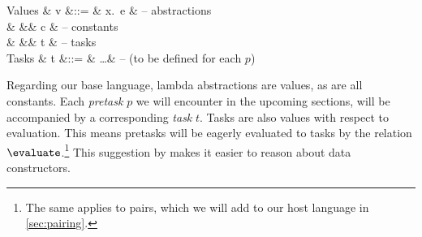 \begin{grammar}
  Values
    & v &::= & \lambda x.\ e  & – abstractions \\
    &   &\mid& c              & – constants \\
    &   &\mid& t              & – tasks \\
  Tasks
    & t &::= & \ldots         & – (to be defined for each $p$) \\
\end{grammar}
Regarding our base language, lambda abstractions are values, as are all constants.
Each \emph{pretask} $p$ we will encounter in the upcoming sections,
will be accompanied by a corresponding \emph{task} $t$.
Tasks are also values with respect to evaluation.
This means pretasks will be eagerly evaluated to tasks by the relation $\evaluate$.\footnote{
  The same applies to pairs,
  which we will add to our host language in \autoref{sec:pairing}.
}
This suggestion by \textcite[p. 323]{books/Harper16PFPL}
makes it easier to reason about data constructors.
